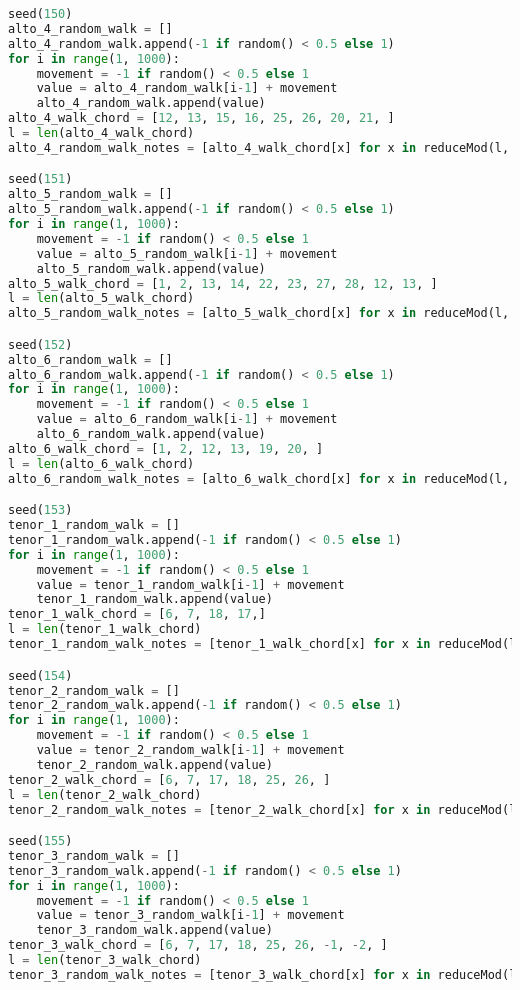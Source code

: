 \begin{lstlisting}[language=Python, caption=Invocation Source Code]
seed(150)
alto_4_random_walk = []
alto_4_random_walk.append(-1 if random() < 0.5 else 1)
for i in range(1, 1000):
    movement = -1 if random() < 0.5 else 1
    value = alto_4_random_walk[i-1] + movement
    alto_4_random_walk.append(value)
alto_4_walk_chord = [12, 13, 15, 16, 25, 26, 20, 21, ]
l = len(alto_4_walk_chord)
alto_4_random_walk_notes = [alto_4_walk_chord[x] for x in reduceMod(l, alto_4_random_walk)]

seed(151)
alto_5_random_walk = []
alto_5_random_walk.append(-1 if random() < 0.5 else 1)
for i in range(1, 1000):
    movement = -1 if random() < 0.5 else 1
    value = alto_5_random_walk[i-1] + movement
    alto_5_random_walk.append(value)
alto_5_walk_chord = [1, 2, 13, 14, 22, 23, 27, 28, 12, 13, ]
l = len(alto_5_walk_chord)
alto_5_random_walk_notes = [alto_5_walk_chord[x] for x in reduceMod(l, alto_5_random_walk)]

seed(152)
alto_6_random_walk = []
alto_6_random_walk.append(-1 if random() < 0.5 else 1)
for i in range(1, 1000):
    movement = -1 if random() < 0.5 else 1
    value = alto_6_random_walk[i-1] + movement
    alto_6_random_walk.append(value)
alto_6_walk_chord = [1, 2, 12, 13, 19, 20, ]
l = len(alto_6_walk_chord)
alto_6_random_walk_notes = [alto_6_walk_chord[x] for x in reduceMod(l, alto_6_random_walk)]

seed(153)
tenor_1_random_walk = []
tenor_1_random_walk.append(-1 if random() < 0.5 else 1)
for i in range(1, 1000):
    movement = -1 if random() < 0.5 else 1
    value = tenor_1_random_walk[i-1] + movement
    tenor_1_random_walk.append(value)
tenor_1_walk_chord = [6, 7, 18, 17,]
l = len(tenor_1_walk_chord)
tenor_1_random_walk_notes = [tenor_1_walk_chord[x] for x in reduceMod(l, tenor_1_random_walk)]

seed(154)
tenor_2_random_walk = []
tenor_2_random_walk.append(-1 if random() < 0.5 else 1)
for i in range(1, 1000):
    movement = -1 if random() < 0.5 else 1
    value = tenor_2_random_walk[i-1] + movement
    tenor_2_random_walk.append(value)
tenor_2_walk_chord = [6, 7, 17, 18, 25, 26, ]
l = len(tenor_2_walk_chord)
tenor_2_random_walk_notes = [tenor_2_walk_chord[x] for x in reduceMod(l, tenor_2_random_walk)]

seed(155)
tenor_3_random_walk = []
tenor_3_random_walk.append(-1 if random() < 0.5 else 1)
for i in range(1, 1000):
    movement = -1 if random() < 0.5 else 1
    value = tenor_3_random_walk[i-1] + movement
    tenor_3_random_walk.append(value)
tenor_3_walk_chord = [6, 7, 17, 18, 25, 26, -1, -2, ]
l = len(tenor_3_walk_chord)
tenor_3_random_walk_notes = [tenor_3_walk_chord[x] for x in reduceMod(l, tenor_3_random_walk)]


\end{lstlisting}

